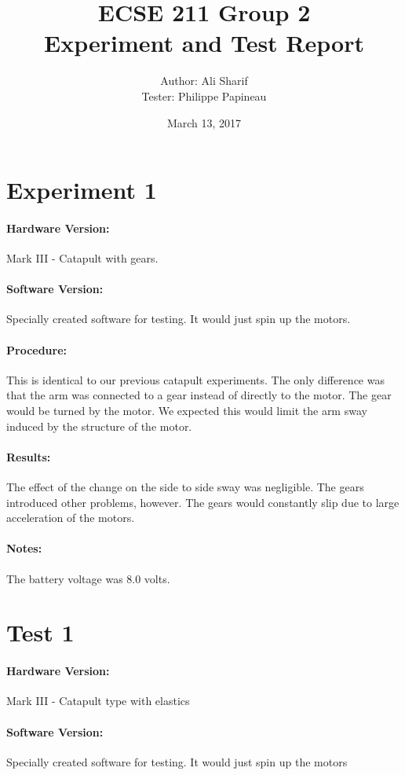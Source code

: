 \documentclass[12pt,letterpaper]{article}
\title{ECSE 211 Group 2 \\ Experiment and Test Report}
\author{Author: Ali Sharif \\ Tester: Philippe Papineau}
\date{March 13, 2017}
\begin{document}
	\maketitle
	
	\section{Experiment 1}
	\paragraph{Hardware Version:}Mark III - Catapult with gears.
	\paragraph{Software Version:}Specially created software for testing. It would just spin up the motors.
	
	\paragraph{Procedure:} This is identical to our previous catapult experiments. The only difference was that the arm was connected to a gear instead of directly to the motor. The gear would be turned by the motor. We expected this would limit the arm sway induced by the structure of the motor.
	\paragraph{Results:} The effect of the change on the side to side sway was negligible. The gears introduced other problems, however. The gears would constantly slip due to large acceleration of the motors.
	
	\paragraph{Notes:} The battery voltage was 8.0 volts.
	
	\section{Test 1}
	\paragraph{Hardware Version:}Mark III - Catapult type with elastics
	\paragraph{Software Version:}Specially created software for testing. It would just spin up the motors
	
\end{document}
